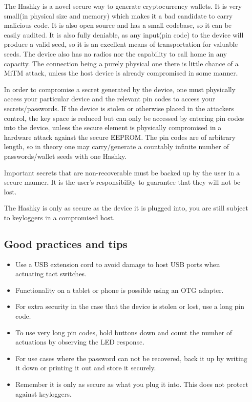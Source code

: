 \documentclass{article}
\begin{document}
The Hashky is a novel secure way to generate cryptocurrency wallets. It is very small(in physical size and memory) which makes it a bad candidate to carry malicious code. It is also open source and has a small codebase, so it can be easily audited. It is also fully deniable, as any input(pin code) to the device will produce a valid seed, so it is an excellent means of transportation for valuable seeds. The device also has no radios nor the capability to call home in any capacity. The connection being a purely physical one there is little chance of a MiTM attack, unless the host device is already compromised in some manner. 

In order to compromise a secret generated by the device, one must physically access your particular device and the relevant pin codes to access your secrets/passwords. If the device is stolen or otherwise placed in the attackers control, the key space is reduced but can only be accessed by entering pin codes into the device, unless the secure element is physically compromised in a hardware attack against the secure EEPROM. The pin codes are of arbitrary length, so in theory one may carry/generate a countably infinite number of passwords/wallet seeds with one Hashky.

Important secrets that are non-recoverable must be backed up by the user in a secure manner. It is the user's responsibility to guarantee that they will not be lost. 

The Hashky is only as secure as the device it is plugged into, you are still subject to keyloggers in a compromised host. 


\subsection{Good practices and tips}

\begin{itemize}
\item Use a USB extension cord to avoid damage to host USB ports when actuating tact switches.
\item Functionality on a tablet or phone is possible using an OTG adapter.
\item For extra security in the case that the device is stolen or lost, use a long pin code.
\item To use very long pin codes, hold buttons down and count the number of actuations by observing the LED response.
\item For use cases where the password can not be recovered, back it up by writing it down or printing it out and store it securely.
\item Remember it is only as secure as what you plug it into. This does not protect against keyloggers. 
\end{itemize} 
\end{document}
